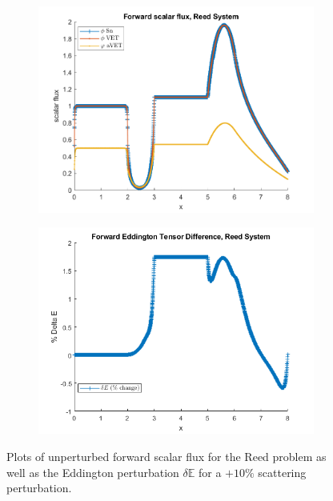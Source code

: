 \documentclass[12pt]{report}
\newcommand{\Edd}{\mathbb{E}}
\begin{document}
\begin{figure}[H]
\centering
\begin{subfigure}{.5\textwidth}
  \centering
  \includegraphics[width=.98\linewidth]{figures2/7phi.png}
\end{subfigure}%
\begin{subfigure}{.5\textwidth}
  \centering
  \includegraphics[width=.98\linewidth]{figures2/7deltaE.png}
\end{subfigure}
\caption{Plots of unperturbed forward scalar flux for the Reed problem as well as the Eddington perturbation $\delta \Edd$ for a $+10 \%$ scattering perturbation.}
\label{fig:Flux4}
\end{figure}
\end{document}
